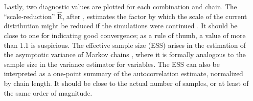Lastly, two diagnostic values are plotted for each combination and chain.  The
\enquote{scale-reduction} \(\widehat{\mathrm{R}}\), after \textcite{gelman1992inference}, estimates
the factor by which the scale of the current distribution might be reduced if the simulations were
continued \parencite[see][p. 285]{gelman2020bayesian}.  It should be close to one for indicating
good convergence; as a rule of thumb, a value of more than \(1.1\) is suspicious.  The effective sample size (ESS) arises in the estimation of the asymptotic variance of
Markov chains \parencite[][section 7.2]{vihola2020lectures}, where it is formally analogous to the
sample size in the variance estimator for \iid{} variables.  The ESS can also be interpreted as a
one-point summary of the autocorrelation estimate, normalized by chain length.  It should be close
to the actual number of samples, or at least of the same order of magnitude.


